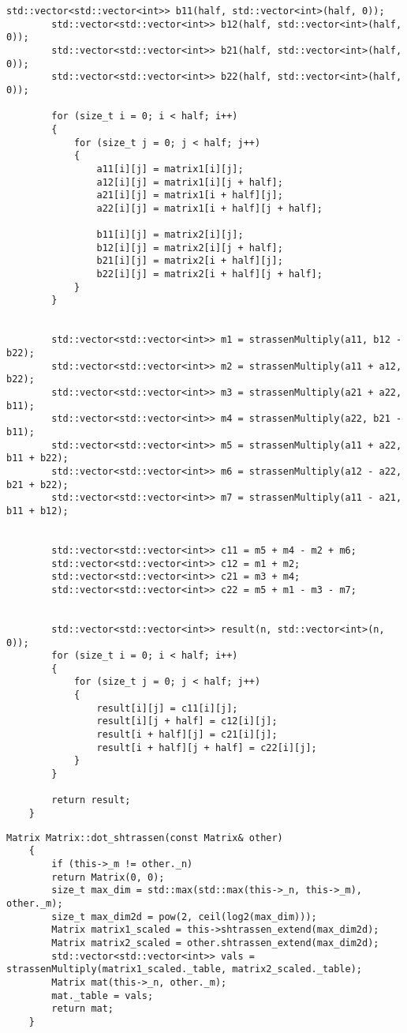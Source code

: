 \begin{appendices}
\begin{lstlisting}[label=lst:stras,caption=Реализация алгоритма расчета произведения матриц Винограда с оптимизациями]
		std::vector<std::vector<int>> b11(half, std::vector<int>(half, 0));
		std::vector<std::vector<int>> b12(half, std::vector<int>(half, 0));
		std::vector<std::vector<int>> b21(half, std::vector<int>(half, 0));
		std::vector<std::vector<int>> b22(half, std::vector<int>(half, 0));
		
		for (size_t i = 0; i < half; i++)
		{
			for (size_t j = 0; j < half; j++)
			{
				a11[i][j] = matrix1[i][j];
				a12[i][j] = matrix1[i][j + half];
				a21[i][j] = matrix1[i + half][j];
				a22[i][j] = matrix1[i + half][j + half];
				
				b11[i][j] = matrix2[i][j];
				b12[i][j] = matrix2[i][j + half];
				b21[i][j] = matrix2[i + half][j];
				b22[i][j] = matrix2[i + half][j + half];
			}
		}
		
		
		std::vector<std::vector<int>> m1 = strassenMultiply(a11, b12 - b22);
		std::vector<std::vector<int>> m2 = strassenMultiply(a11 + a12, b22);
		std::vector<std::vector<int>> m3 = strassenMultiply(a21 + a22, b11);
		std::vector<std::vector<int>> m4 = strassenMultiply(a22, b21 - b11);
		std::vector<std::vector<int>> m5 = strassenMultiply(a11 + a22, b11 + b22);
		std::vector<std::vector<int>> m6 = strassenMultiply(a12 - a22, b21 + b22);
		std::vector<std::vector<int>> m7 = strassenMultiply(a11 - a21, b11 + b12);
		
		
		std::vector<std::vector<int>> c11 = m5 + m4 - m2 + m6;
		std::vector<std::vector<int>> c12 = m1 + m2;
		std::vector<std::vector<int>> c21 = m3 + m4;
		std::vector<std::vector<int>> c22 = m5 + m1 - m3 - m7;
		
		
		std::vector<std::vector<int>> result(n, std::vector<int>(n, 0));
		for (size_t i = 0; i < half; i++)
		{
			for (size_t j = 0; j < half; j++)
			{
				result[i][j] = c11[i][j];
				result[i][j + half] = c12[i][j];
				result[i + half][j] = c21[i][j];
				result[i + half][j + half] = c22[i][j];
			}
		}
		
		return result;
	}
	\end{lstlisting}
	
	
	
	\begin{lstlisting}[label=lst:stras_meth,caption= Метод расчета произведения алгоритмом штрассена с расширением исходной матрицы]
	Matrix Matrix::dot_shtrassen(const Matrix& other)
	{
		if (this->_m != other._n)
		return Matrix(0, 0);
		size_t max_dim = std::max(std::max(this->_n, this->_m), other._m);
		size_t max_dim2d = pow(2, ceil(log2(max_dim)));
		Matrix matrix1_scaled = this->shtrassen_extend(max_dim2d);
		Matrix matrix2_scaled = other.shtrassen_extend(max_dim2d);
		std::vector<std::vector<int>> vals = strassenMultiply(matrix1_scaled._table, matrix2_scaled._table);
		Matrix mat(this->_n, other._m);
		mat._table = vals;
		return mat;
	}
	\end{lstlisting}
	

\end{appendices}
